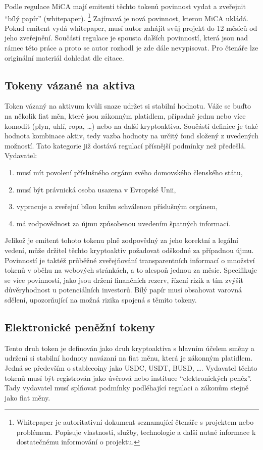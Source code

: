 Podle regulace MiCA mají emitenti těchto tokenů povinnost vydat a zveřejnit \enquote{bílý papír} (whitepaper).
\footnote{Whitepaper je autoritativní dokument seznamující čtenáře s projektem nebo problémem. Popisuje vlastnosti, služby, technologie a další nutné informace k dostatečnému informování o projektu.}
Zajímavá je nová povinnost,
kterou MiCA ukládá. Pokud emitent vydá whitepaper, musí autor zahájit svůj projekt do 12 měsíců od jeho zveřejnění. Součástí regulace je spousta dalších povinností, která jsou nad rámec
této práce a proto se autor rozhodl je zde dále nevypisovat. Pro čtenáře lze originální materiál dohledat dle citace.

\subsection{Tokeny vázané na aktiva}
Token vázaný na aktivum kvůli snaze udržet si stabilní hodnotu. Váže se buďto na několik fiat měn, které jsou zákonným platidlem, případně jednu nebo více komodit (plyn, uhlí, ropa, \ldots)
nebo na další kryptoaktiva. Součástí definice je také hodnota kombinace aktiv, tedy vazba hodnoty na určitý fond složený z uvedených možností. Tato kategorie již dostává regulací přísnější
podmínky než předešlá. Vydavatel:
\begin{enumerate}
    \item musí mít povolení příslušného orgánu svého domovského členského státu,
    \item musí být právnická osoba usazena v Evropské Unii,
    \item vypracuje a zveřejní bílou knihu schválenou příslušným orgánem,
    \item má zodpovědnost za újmu způsobenou uvedením špatných informací.
\end{enumerate}
Jelikož je emitent tohoto tokenu plně zodpovědný za jeho korektní a legální vedení, může držitel těchto kryptoaktiv požadovat odškodné za případnou újmu. Povinností je taktéž
průběžné zveřejňování transparentních informací o množství tokenů v oběhu na webových stránkách, a to alespoň jednou za měsíc. Specifikuje se více povinností, jako jsou držení
finančních rezerv, řízení rizik a tím zvýšit důvěryhodnost u potenciálních investorů. Bílý papír musí obsahovat varovná sdělení, upozorňující na možná rizika spojená s těmito
tokeny.

\subsection{Elektronické peněžní tokeny}
Tento druh token je definován jako druh kryptoaktiva s hlavním účelem směny a udržení si stabilní hodnoty navázaní na fiat měnu, která je zákonným platidlem. Jedná se především o stablecoiny
jako USDC, USDT, BUSD, \ldots. Vydavatel těchto tokenů musí být registrován jako úvěrová nebo instituce \enquote{elektronických peněz}. Tady vydavatel musí splňovat podmínky
podléhající regulaci a zákonům stejně jako fiat měny.

\endinput